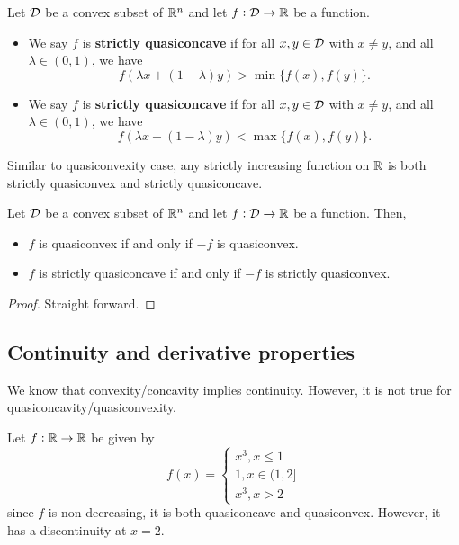 \begin{refsection}
\begin{example}
\end{example}


\begin{definition}
	Let $\mathcal{D}$ be a convex subset of $\mathbb{R}^n$ and let $f:\mathcal{D}\to \mathbb{R}$ be a function.
	\begin{itemize}
		\item We say $f$ is \textbf{strictly quasiconcave} if for all $x, y\in \mathcal{D}$ with $x\neq y$, and all $\lambda \in (0,1)$, we have
		$$f(\lambda x + (1-\lambda)y) > \min\{f(x), f(y)\}.$$
		\item We say $f$ is \textbf{strictly quasiconcave} if for all $x, y\in \mathcal{D}$ with $x\neq y$, and all $\lambda \in (0,1)$, we have
		$$f(\lambda x + (1-\lambda)y) < \max\{f(x), f(y)\}.$$ 
	\end{itemize}		
\end{definition}

\begin{remark}
	Similar to quasiconvexity case, any strictly increasing function on $\mathbb{R}$ is both strictly quasiconvex and strictly quasiconcave. 
\end{remark}




\begin{lemma}
	Let $\mathcal{D}$ be a convex subset of $\mathbb{R}^n$ and let $f:\mathcal{D}\to \mathbb{R}$ be a function. Then,
	\begin{itemize}
		\item $f$ is quasiconvex if and only if $-f$ is quasiconvex. 
		\item $f$ is strictly quasiconcave if and only if $-f$ is strictly quasiconvex. 
	\end{itemize}
\end{lemma}
\begin{proof}
	Straight forward.
\end{proof}


\subsection{Continuity and derivative properties}

\begin{note}
	We know that convexity/concavity implies continuity. However, it is not true for 	quasiconcavity/quasiconvexity.
\end{note}

\begin{example}
	Let $f:\mathbb{R}\to \mathbb{R}$ be given by
	$$f(x) = \begin{cases}
	x^3, x\leq 1 \\
	1, x\in (1,2] \\
	x^3, x > 2  
	\end{cases}$$
	since $f$ is non-decreasing, it is both quasiconcave and quasiconvex. However, it has a discontinuity at $x = 2$.
\end{example}



\end{refsection}
